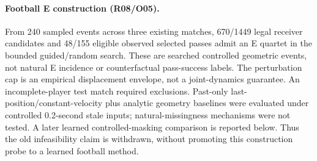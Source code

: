 \paragraph{Football E construction (R08/O05).} From 240 sampled events across three existing matches, 670/1449 legal receiver candidates and 48/155 eligible observed selected passes admit an E quartet in the bounded guided/random search. These are searched controlled geometric events, not natural E incidence or counterfactual pass-success labels. The perturbation cap is an empirical displacement envelope, not a joint-dynamics guarantee. An incomplete-player test match required exclusions. Past-only last-position/constant-velocity plus analytic geometry baselines were evaluated under controlled 0.2-second stale inputs; natural-missingness mechanisms were not tested. A later learned controlled-masking comparison is reported below. Thus the old infeasibility claim is withdrawn, without promoting this construction probe to a learned football method.
